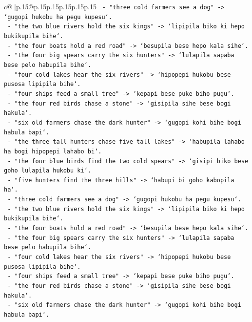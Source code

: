 \documentclass{article}
\begin{document}
{\begin{supertabular}{c@{$\;$}|p{.15\linewidth}@{}p{.15\linewidth}p{.15\linewidth}p{.15\linewidth}p{.15\linewidth}p{.15\linewidth}}
{{{\texttt{  {-} "three cold farmers see a dog" {-}> `gugopi hukobu ha pegu kupesu`.} \\
\texttt{  {-} "the two blue rivers hold the six kings" {-}> `lipipila biko ki hepo bukikupila bihe`.} \\
\texttt{  {-} "the four boats hold a red road" {-}> `besupila bese hepo kala sihe`.} \\
\texttt{  {-} "the four big spears carry the six hunters" {-}> `lulapila sapaba bese pelo habupila bihe`.} \\
\texttt{  {-} "four cold lakes hear the six rivers" {-}> `hipopepi hukobu bese pusosa lipipila bihe`.} \\
\texttt{  {-} "four ships feed a small tree" {-}> `kepapi bese puke biho pugu`.} \\
\texttt{  {-} "the four red birds chase a stone" {-}> `gisipila sihe bese bogi hakula`.} \\
\texttt{  {-} "six old farmers chase the dark hunter" {-}> `gugopi kohi bihe bogi habula bapi`.} \\
\texttt{  {-} "the three tall hunters chase five tall lakes" {-}> `habupila lahabo ha bogi hipopepi lahabo bi`.} \\
\texttt{  {-} "the four blue birds find the two cold spears" {-}> `gisipi biko bese goho lulapila hukobu ki`.} \\
\texttt{  {-} "five hunters find the three hills" {-}> `habupi bi goho kabopila ha`.} \\
\texttt{  {-} "three cold farmers see a dog" {-}> `gugopi hukobu ha pegu kupesu`.} \\
\texttt{  {-} "the two blue rivers hold the six kings" {-}> `lipipila biko ki hepo bukikupila bihe`.} \\
\texttt{  {-} "the four boats hold a red road" {-}> `besupila bese hepo kala sihe`.} \\
\texttt{  {-} "the four big spears carry the six hunters" {-}> `lulapila sapaba bese pelo habupila bihe`.} \\
\texttt{  {-} "four cold lakes hear the six rivers" {-}> `hipopepi hukobu bese pusosa lipipila bihe`.} \\
\texttt{  {-} "four ships feed a small tree" {-}> `kepapi bese puke biho pugu`.} \\
\texttt{  {-} "the four red birds chase a stone" {-}> `gisipila sihe bese bogi hakula`.} \\
\texttt{  {-} "six old farmers chase the dark hunter" {-}> `gugopi kohi bihe bogi habula bapi`.} \\
}}}
\end{supertabular}}
\end{document}
